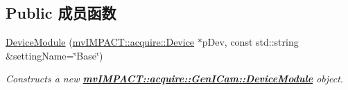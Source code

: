 \subsection*{Public 成员函数}
\begin{DoxyCompactItemize}
\item 
\hyperlink{classmv_i_m_p_a_c_t_1_1acquire_1_1_gen_i_cam_1_1_device_module_ada7102c00fd8939e399670e062680c21}{Device\+Module} (\hyperlink{classmv_i_m_p_a_c_t_1_1acquire_1_1_device}{mv\+I\+M\+P\+A\+C\+T\+::acquire\+::\+Device} $\ast$p\+Dev, const std\+::string \&setting\+Name=\char`\"{}Base\char`\"{})
\begin{DoxyCompactList}\small\item\em Constructs a new {\bfseries \hyperlink{classmv_i_m_p_a_c_t_1_1acquire_1_1_gen_i_cam_1_1_device_module}{mv\+I\+M\+P\+A\+C\+T\+::acquire\+::\+Gen\+I\+Cam\+::\+Device\+Module}} object. \end{DoxyCompactList}\end{DoxyCompactItemize}
